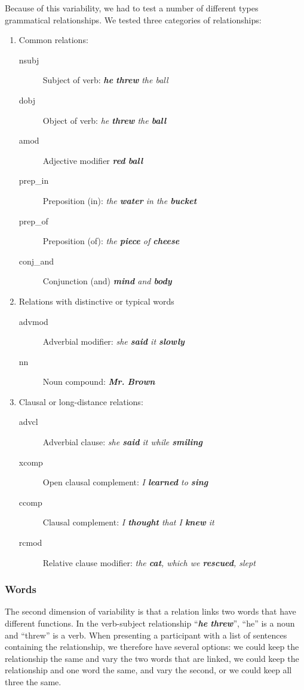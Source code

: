 \documentclass{sigchi}
\begin{document}
Because of this variability, we had to test a number of different types grammatical relationships. We tested three categories of relationships:
\begin{enumerate}
	\item Common relations:
		\begin{description}
			\item[nsubj] Subject of verb: \emph{\textbf{he} \textbf{threw} the ball}
			\item [dobj] Object of verb:  \emph{ he \textbf{threw} the \textbf{ball}}
			\item [amod] Adjective modifier \emph{\textbf{red} \textbf{ball}}
			\item [prep\_in]  Preposition (in): \emph{ the \textbf{water} in the \textbf{bucket}}
			\item [prep\_of]	Preposition (of):  \emph{ the \textbf{piece} of \textbf{cheese}}
			\item [conj\_and]  Conjunction (and)  \emph{ \textbf{mind} and \textbf{body}}
		\end{description}
	\item Relations with distinctive or typical words
		\begin{description}
		\item[advmod] Adverbial modifier: \emph{  she \textbf{said} it \textbf{slowly}}
		\item [nn] Noun compound:  \emph{ \textbf{Mr.}  \textbf{Brown}}
		\end{description}
	\item Clausal or long-distance relations:
		\begin{description}
			\item[advcl] Adverbial clause: \emph{  she \textbf{said} it while \textbf{smiling}}
			\item [xcomp] Open clausal complement:  \emph{I \textbf{learned} to \textbf{sing} }
			\item [ccomp] Clausal complement:  \emph{ I \textbf{thought} that I \textbf{knew} it}
			\item [rcmod] Relative clause modifier:  \emph{the \textbf{cat}, which we \textbf{rescued}, slept }
		\end{description}

\end{enumerate}

\subsubsection{Words}
The second dimension of variability is that a relation links two words that have different functions. In the verb-subject relationship ``\emph{\textbf{he} \textbf{threw}}'', ``he'' is a noun and ``threw'' is a verb. When presenting a participant with a list of sentences containing the relationship, we therefore have several options: we could keep the relationship the same and vary the two words that are linked,  we could keep the relationship and one word the same, and vary the second, or we could keep all three the same.
\end{document}
